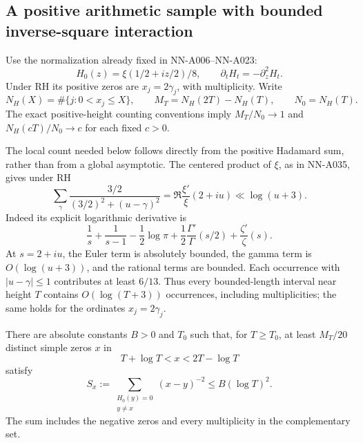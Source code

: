 \subsection*{A positive arithmetic sample with bounded inverse-square interaction}

Use the normalization already fixed in NN-A006--NN-A023:
\[
 H_0(z)=\xi(1/2+iz/2)/8,\qquad
 \partial_tH_t=-\partial_z^2H_t.
\]
Under RH its positive zeros are \(x_j=2\gamma_j\), with
multiplicity. Write
\[
 N_H(X)=\#\{j:0<x_j\le X\},\qquad
 M_T=N_H(2T)-N_H(T),\qquad N_0=N_H(T).
\]
The exact positive-height counting conventions imply
\(M_T/N_0\to1\) and \(N_H(cT)/N_0\to c\) for each fixed
\(c>0\).

The local count needed below follows directly from the
positive Hadamard sum, rather than from a global asymptotic.
The centered product of \(\xi\), as in NN-A035, gives under RH
\[
 \sum_\gamma
 \frac{3/2}{(3/2)^2+(u-\gamma)^2}
                  =\Re\frac{\xi'}{\xi}(2+iu)\ll\log(u+3).
\]
Indeed its explicit logarithmic derivative is
\[
 \frac1s+\frac1{s-1}-\frac12\log\pi
       +\frac12\frac{\Gamma'}{\Gamma}(s/2)
       +\frac{\zeta'}{\zeta}(s).
\]
At \(s=2+iu\), the Euler term is absolutely bounded,
the gamma term is \(O(\log(u+3))\), and the rational
terms are bounded. Each occurrence with \(|u-\gamma|\le1\)
contributes at least \(6/13\). Thus every bounded-length
interval near height \(T\) contains \(O(\log(T+3))\)
occurrences, including multiplicities; the same holds
for the ordinates \(x_j=2\gamma_j\).

\begin{lemma}\label{lem:A050-sample}
There are absolute constants \(B>0\) and \(T_0\) such that,
for \(T\ge T_0\), at least \(M_T/20\) distinct simple zeros
\(x\) in
\[
                         T+\log T<x<2T-\log T
\]
satisfy
\begin{equation}\label{eq:A050-interaction}
 S_x:=\sum_{\substack{H_0(y)=0\\y\ne x}}(x-y)^{-2}
                                      \le B(\log T)^2.
\end{equation}
The sum includes the negative zeros and every multiplicity
in the complementary set.
\end{lemma}

